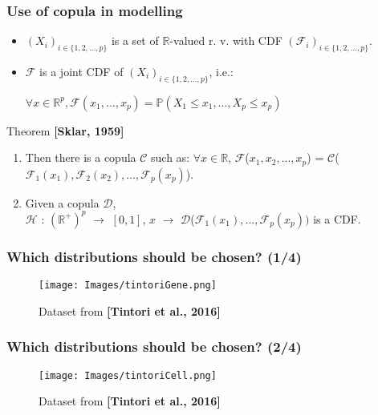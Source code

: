 \documentclass{beamer}
\begin{document}
\begin{frame}
\frametitle{Use of copula in modelling}

\begin{itemize}
\item $(X_i)_{i \in \{1, 2, ..., p\}}$ is a set of $\mathbb{R}$-valued r. v. with CDF $(\mathscr{F}_i)_{i \in \{1, 2, ..., p\}}$.
\item $\mathscr{F}$ is a joint CDF of $(X_i)_{i \in \{1, 2, ..., p\}}$, i.e.:\\
\begin{center}
$\forall x \in \mathbb{R}^p, \mathscr{F}(x_1, ..., x_p) = \mathbb{P}(X_1 \leq x_1, ..., X_p \leq x_p)$
\end{center}
\end{itemize}

\pause

\begin{alertblock}{Theorem \textbf{[Sklar, 1959]}} 
\begin{enumerate}[<+>]
\item Then there is a copula $\mathscr{C}$ such as: $\forall x \in \mathbb{R}$, $\mathscr{F}$($x_1, x_2, ..., x_p$) = $\mathscr{C}$($\mathscr{F}_1(x_1), \mathscr{F}_2(x_2), ..., \mathscr{F}_p(x_p)$).
\item Given a copula $\mathscr{D}$,\\$\mathscr{H}$ : $(\mathbb{R}^+)^p$ $\rightarrow$ $[0,1]$, $x$ $\rightarrow$ $\mathscr{D}$($\mathscr{F}_1(x_1), ..., \mathscr{F}_p(x_p))$ is a CDF.
\end{enumerate}
\end{alertblock}

\end{frame}

\begin{frame}
\frametitle{Which distributions should be chosen? (1/4)}

\begin{figure}
\centering
\texttt{[image: Images/tintoriGene.png]}
\caption{Dataset from \textbf{[Tintori et al., 2016]}}
\end{figure}

\end{frame}

\begin{frame}
\frametitle{Which distributions should be chosen? (2/4)}

\begin{figure}
\centering
\texttt{[image: Images/tintoriCell.png]}
\caption{Dataset from \textbf{[Tintori et al., 2016]}}
\end{figure}

\end{frame}
\end{document}
